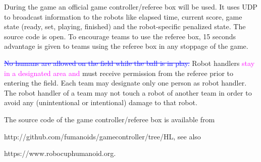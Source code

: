 \bigskip

During the game an official game controller/referee box will be used. It uses UDP to broadcast information to the robots like elapsed time, current score, game state (ready, set, playing, finished) and the robot-specific penalized state. The source code is open. To encourage teams to use the referee box, 15 seconds advantage is given to teams using the referee box in any stoppage of the game.



\bigskip

\textcolor{blue}{\sout{No humans are allowed on the field while the ball is in play.}} Robot handlers \textcolor{magenta}{stay in a designated area and} must receive permission from the referee prior to entering the field. Each team may designate only one person as robot handler. The robot handler of a team may not touch a robot of another team in order to avoid any (unintentional or intentional) damage to that robot. 

\bigskip

The source code of the game controller/referee box is available from 

\textcolor[rgb]{0.0,0.0,0.49803922}{http://github.com/fumanoids/gamecontroller/tree/HL},
see also 

\textcolor[rgb]{0.0,0.0,0.49803922}{https://www.robocuphumanoid.org}.


